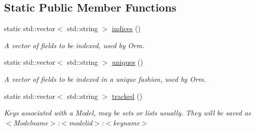 \subsection*{Static Public Member Functions}
\begin{DoxyCompactItemize}
\item 
static std\-::vector$<$ std\-::string $>$ \hyperlink{classredis3m_1_1patterns_1_1model_a250c0e67b38d5f2cc0f3dfd43ebc651e}{indices} ()
\begin{DoxyCompactList}\small\item\em A vector of fields to be indexed, used by Orm. \end{DoxyCompactList}\item 
static std\-::vector$<$ std\-::string $>$ \hyperlink{classredis3m_1_1patterns_1_1model_af8a02d965738e983649b27a6c87d34a6}{uniques} ()
\begin{DoxyCompactList}\small\item\em A vector of fields to be indexed in a unique fashion, used by Orm. \end{DoxyCompactList}\item 
static std\-::vector$<$ std\-::string $>$ \hyperlink{classredis3m_1_1patterns_1_1model_ad519cef941cae44d1a8da302558dd439}{tracked} ()
\begin{DoxyCompactList}\small\item\em Keys associated with a Model, may be sets or lists usually. They will be saved as $<$\-Modelname$>$\-:$<$modelid$>$\-:$<$keyname$>$ \end{DoxyCompactList}\end{DoxyCompactItemize}
